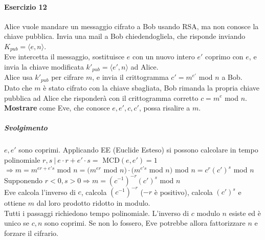 \documentclass[10pt]{book}
\begin{document}
\paragraph{Esercizio 12} Alice vuole mandare un messaggio cifrato a Bob usando RSA, ma non conosce la chiave pubblica. Invia una mail a Bob chiedendogliela, che risponde inviando $K_{pub} = \langle e,n\rangle$.\\
Eve intercetta il messaggio, sostituisce $e$ con un nuovo intero $e'$ coprimo con $e$, e invia la chiave modificata $k'_{pub} = \langle e',n\rangle$ ad Alice.\\
Alice usa $k'_{pub}$ per cifrare $m$, e invia il crittogramma $c' = m^{e'}$ mod $n$ a Bob.\\
Dato che $m$ è stato cifrato con la chiave sbagliata, Bob rimanda la propria chiave pubblica ad Alice che risponderà con il crittogramma corretto $c = m^e$ mod $n$.\\
\textbf{Mostrare} come Eve, che conosce $e,e',c,c'$, possa risalire a $m$.
\subparagraph{Svolgimento} $e,e'$ sono coprimi. Applicando EE (Euclide Esteso) si possono calcolare in tempo polinomiale $r,s\:|\:e\cdot r + e'\cdot s =$ MCD$(e,e')=1$\\
$\Rightarrow m = m^{er+e's}$ mod $n = (m^{er}$ mod $n)\cdot(m^{e's}$ mod $n)$ mod $n = c^r(c')^s$ mod $n$\\
Supponendo $r<0,s>0 \Rightarrow m = (c^{-1})^{-r}(c')^s$ mod $n$\\Eve calcola l'inverso di $c$, calcola $(c^{-1})^{-r}$ ($-r$ è positivo), calcola $(c')^s$ e ottiene $m$ dal loro prodotto ridotto in modulo.\\
Tutti i passaggi richiedono tempo polinomiale. L'inverso di $c$ modulo $n$ esiste ed è unico se $c,n$ sono coprimi. Se non lo fossero, Eve potrebbe allora fattorizzare $n$ e forzare il cifrario.
\end{document}
